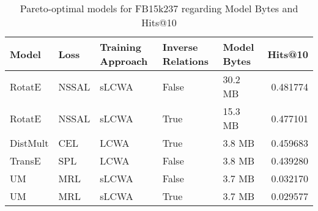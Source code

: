 \begin{table}
\centering
\caption{Pareto-optimal models for FB15k237 regarding Model Bytes and Hits@10}
\begin{tabular}{lllllr}
\toprule
    Model &   Loss & Training Approach & Inverse Relations & Model Bytes &   Hits@10 \\
\midrule
   RotatE &  NSSAL &             sLCWA &             False &     30.2 MB &  0.481774 \\
   RotatE &  NSSAL &             sLCWA &              True &     15.3 MB &  0.477101 \\
 DistMult &    CEL &              LCWA &              True &      3.8 MB &  0.459683 \\
   TransE &    SPL &              LCWA &             False &      3.8 MB &  0.439280 \\
       UM &    MRL &             sLCWA &             False &      3.7 MB &  0.032170 \\
       UM &    MRL &             sLCWA &              True &      3.7 MB &  0.029577 \\
\bottomrule
\end{tabular}
\end{table}

